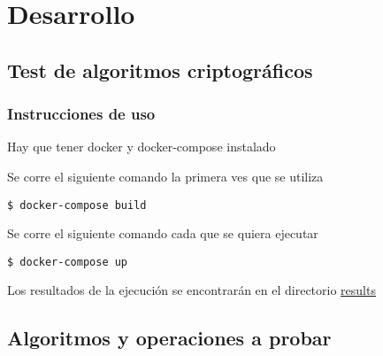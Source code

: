 \documentclass[../main.tex]{subfiles}
\begin{document}
\section{Desarrollo}\label{sec:desarrollo}

\subsection{Test de algoritmos criptográficos}\label{test-de-algoritmos-criptograficos}

\subsubsection{Instrucciones de uso}\label{instrucciones-de-uso}

Hay que tener docker y docker-compose instalado

Se corre el siguiente comando la primera ves que se utiliza


\begin{code}
\begin{verbatim}
$ docker-compose build
\end{verbatim}
\end{code}

Se corre el siguiente comando cada que se quiera ejecutar

\begin{code}
\begin{verbatim}
$ docker-compose up
\end{verbatim}
\end{code}

Los resultados de la ejecución se encontrarán en el directorio
\href{./results}{results}

\subsection{Algoritmos y operaciones a probar}\label{algoritmos-a-probar}
\end{document}
